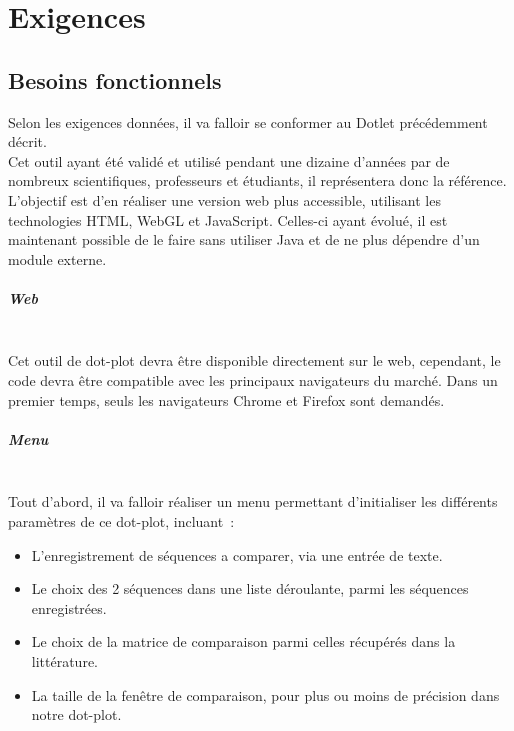 \documentclass{report}
\begin{document}
\chapter{Exigences}
\section{Besoins fonctionnels}
Selon les exigences données, il va falloir se conformer au Dotlet précédemment décrit.\\
Cet outil ayant été validé et utilisé pendant une dizaine d'années par de nombreux scientifiques, professeurs et étudiants, il représentera donc la référence.\\
L'objectif est d'en réaliser une version web plus accessible, utilisant les technologies HTML, WebGL et JavaScript. Celles-ci ayant évolué, il est maintenant possible de le faire sans utiliser Java et de ne plus dépendre d'un module externe.\\

\paragraph{Web} ~\\

Cet outil de dot-plot devra être disponible directement sur le web, cependant, le code devra être compatible avec les principaux navigateurs du marché.
Dans un premier temps, seuls les navigateurs Chrome et Firefox sont demandés.

\paragraph{Menu} ~\\

Tout d'abord, il va falloir réaliser un menu permettant d'initialiser les différents paramètres de ce dot-plot, incluant~:
\begin{itemize}
	\item L'enregistrement de séquences a comparer, via une entrée de texte.
	\item Le choix des 2 séquences dans une liste déroulante, parmi les séquences enregistrées.
	\item Le choix de la matrice de comparaison parmi celles récupérés dans la littérature.
	\item La taille de la fenêtre de comparaison, pour plus ou moins de précision dans notre dot-plot.
\end{itemize}
\end{document}
